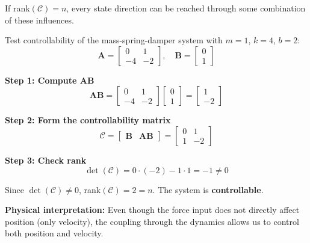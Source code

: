 If rank$(\mathcal{C}) = n$, every state direction can be reached through some combination of these influences.

\begin{example}
\label{ex:controllability_msd}
Test controllability of the mass-spring-damper system with $m = 1$, $k = 4$, $b = 2$:
\begin{equation}
\mathbf{A} = \begin{bmatrix} 0 & 1 \\ -4 & -2 \end{bmatrix}, \quad \mathbf{B} = \begin{bmatrix} 0 \\ 1 \end{bmatrix}
\end{equation}

\textbf{Step 1: Compute $\mathbf{A}\mathbf{B}$}
\begin{equation}
\mathbf{A}\mathbf{B} = \begin{bmatrix} 0 & 1 \\ -4 & -2 \end{bmatrix}\begin{bmatrix} 0 \\ 1 \end{bmatrix} = \begin{bmatrix} 1 \\ -2 \end{bmatrix}
\end{equation}

\textbf{Step 2: Form the controllability matrix}
\begin{equation}
\mathcal{C} = \begin{bmatrix} \mathbf{B} & \mathbf{A}\mathbf{B} \end{bmatrix} = \begin{bmatrix} 0 & 1 \\ 1 & -2 \end{bmatrix}
\end{equation}

\textbf{Step 3: Check rank}
\begin{equation}
\det(\mathcal{C}) = 0 \cdot (-2) - 1 \cdot 1 = -1 \neq 0
\end{equation}

Since $\det(\mathcal{C}) \neq 0$, rank$(\mathcal{C}) = 2 = n$. The system is \textbf{controllable}.

\textbf{Physical interpretation:} Even though the force input does not directly affect position (only velocity), the coupling through the dynamics allows us to control both position and velocity.
\end{example}

